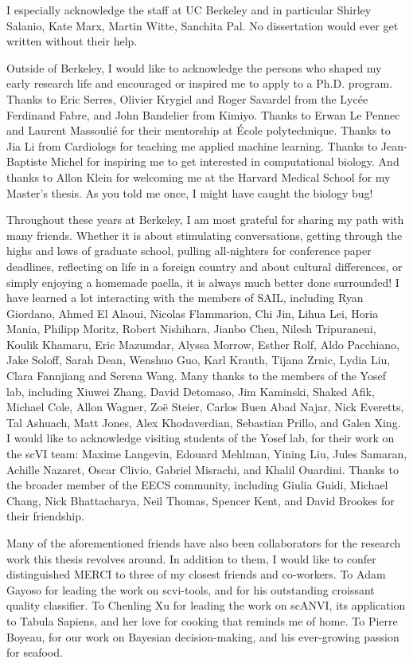 \begin{acknowledgements}
I especially acknowledge the staff at UC Berkeley and in particular Shirley Salanio, Kate Marx, Martin Witte, Sanchita Pal. No dissertation would ever get written without their help. 

Outside of Berkeley, I would like to acknowledge the persons who shaped my early research life and encouraged or inspired me to apply to a Ph.D. program. Thanks to Eric Serres, Olivier Krygiel and Roger Savardel from the Lyc\'ee Ferdinand Fabre, and John Bandelier from Kimiyo. Thanks to Erwan Le Pennec and Laurent Massouli\'e for their mentorship at \'Ecole polytechnique. Thanks to Jia Li from Cardiologs for teaching me applied machine learning. Thanks to Jean-Baptiste Michel for inspiring me to get interested in computational biology. And thanks to Allon Klein for welcoming me at the Harvard Medical School for my Master's thesis. As you told me once, I might have caught the biology bug! 

Throughout these years at Berkeley, I am most grateful for sharing my path with many friends. Whether it is about stimulating conversations, getting through the highs and lows of graduate school, pulling all-nighters for conference paper deadlines, reflecting on life in a foreign country and about cultural differences, or simply enjoying a homemade paella, it is always much better done surrounded! I have learned a lot interacting with the members of SAIL, including Ryan Giordano, Ahmed El Alaoui, Nicolas Flammarion, Chi Jin, Lihua Lei, Horia Mania, Philipp Moritz, Robert Nishihara, Jianbo Chen, Nilesh Tripuraneni, Koulik Khamaru, Eric Mazumdar, Alyssa Morrow, Esther Rolf, Aldo Pacchiano, Jake Soloff, Sarah Dean, Wenshuo Guo, Karl Krauth, Tijana Zrnic, Lydia Liu, Clara Fannjiang and Serena Wang. Many thanks to the members of the Yosef lab, including Xiuwei Zhang, David Detomaso, Jim Kaminski, Shaked Afik, Michael Cole, Allon Wagner, Zoë Steier, Carlos Buen Abad Najar, Nick Everetts, Tal Ashuach, Matt Jones, Alex Khodaverdian, Sebastian Prillo, and Galen Xing. I would like to acknowledge visiting students of the Yosef lab, for their work on the scVI team: Maxime Langevin, Edouard Mehlman, Yining Liu, Jules Samaran, Achille Nazaret, Oscar Clivio, Gabriel Misrachi, and Khalil Ouardini. Thanks to the broader member of the EECS community, including Giulia Guidi, Michael Chang, Nick Bhattacharya, Neil Thomas, Spencer Kent, and David Brookes for their friendship.

Many of the aforementioned friends have also been collaborators for the research work this thesis revolves around. In addition to them, I would like to confer distinguished MERCI to three of my closest friends and co-workers. To Adam Gayoso for leading the work on scvi-tools, and for his outstanding croissant quality classifier. To Chenling Xu for leading the work on scANVI, its application to Tabula Sapiens, and her love for cooking that reminds me of home. To Pierre Boyeau, for our work on Bayesian decision-making, and his ever-growing passion for seafood. 


\end{acknowledgements}
